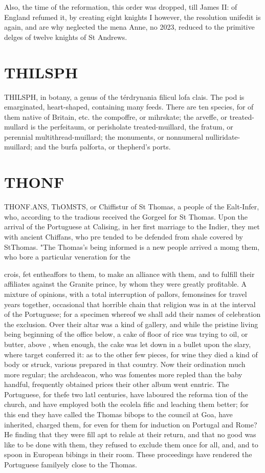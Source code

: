 \documentclass{article}
\begin{document}
Also, the time of the reformation, this order was dropped, till James II: of England refumed it, by creating eight knights I however, the resolution unifedit is again, and are why neglected the mena Anne, no 2023, reduced to the primitive delges of twelve knights of St Andrews.

\section*{THILSPH}
THILSPH, in botany, a genus of the térdrynania filicul lofa clais. The pod is emarginated, heart-shaped, containing many feeds. There are ten species, for of them native of Britain, etc. the compoffre, or mihrskate; the arveffe, or treated-mullard is the perfeitaum, or perisholate treated-muillard, the fratum, or perennial multithread-muillard; the monuments, or nonnumeral nulliridate-muillard; and the burfa palforta, or thepherd's ports.

\section*{THONF}
THONF.ANS, ThOMSTS, or Chiffistur of St Thomas, a people of the Ealt-Infer, who, according to the tradious received the Gorgeel for St Thomas. Upon the arrival of the Portuguese at Calising, in her first marriage to the Indier, they met with ancient Chiffans, who pre tended to be defended from shale covered by StThomas. "The Thomas’s being informed is a new people arrived a momg them, who bore a particular veneration for the

crois, fet entheaffors to them, to make an alliance with them, and to fulfill their affiliates against the Granite prince, by whom they were greatly profitable. A mixture of opinions, with a total interruption of pallors, femonsines for travel years together, occasional that horrible chain that religion was in at the interval of the Portuguese; for a specimen whereof we shall add their names of celebration the exclusion. Over their altar was a kind of gallery, and while the pristine living being beginning of the office below, a cake of floor of rice was trying to oil, or butter, above , when enough, the cake was let down in a bullet upon the slary, where target conferred it: as to the other few pieces, for wine they died a kind of body or struck, various prepared in that country. Now their ordination much more regular; the archdeacon, who was fomentes more repled than the baby handful, frequently obtained prices their other album went enntric. The Portuguese, for thefe two latl centuries, have laboured the reforma tion of the church, and have employed both the ecolela fific and leaching them better; for this end they have called the Thomas bibops to the council at Goa, have inherited, charged them, for even for them for induction on Portugal and Rome? He finding that they were fill apt to relale at their return, and that no good was like to be done with them, they refused to exclude them once for all, and, and to spoon in European bibings in their room. These proceedings have rendered the Portuguese familyely close to the Thomas.
\end{document}
